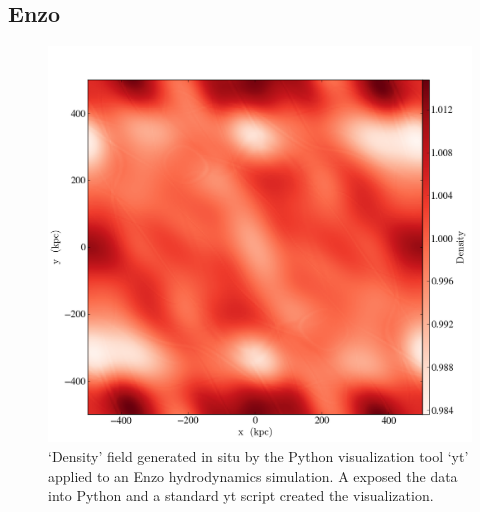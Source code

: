 %
%
%
%
%
%
%
%

\subsection{Enzo}
\label{sec:enzo-example}

\begin{figure}
  \centering
  \includegraphics[width=\linewidth]{images/fp/enzo-density}
  \caption{`Density' field generated in situ by the Python
  visualization tool `yt' applied to an Enzo hydrodynamics simulation.
  A \freeprocessor{} exposed the data into Python and a standard yt
  script created the visualization.}
  \label{fig:enzo}
\end{figure}

